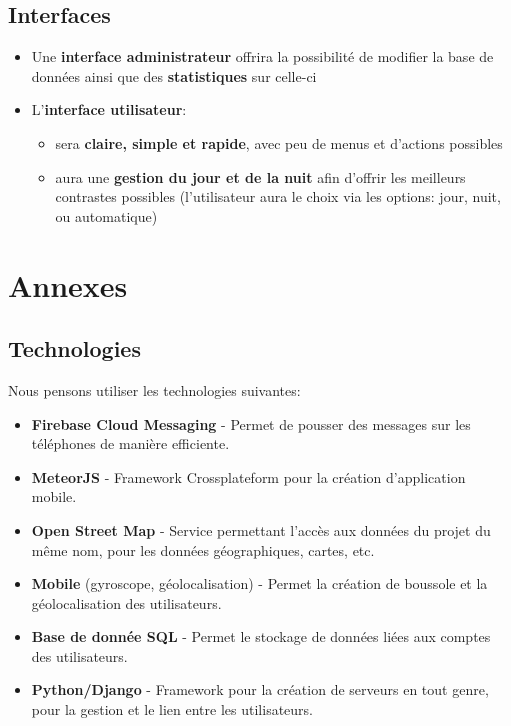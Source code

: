 \documentclass[french]{article}
\begin{document}
		\subsection{Interfaces}
			\begin{itemize}
				\item Une \textbf{interface administrateur} offrira la possibilité de modifier la base de données ainsi que des \textbf{statistiques} sur celle-ci
				\item L'\textbf{interface utilisateur}:
				\begin{itemize}
					\item sera \textbf{claire, simple et rapide}, avec peu de menus et d'actions possibles
					\item aura une \textbf{gestion du jour et de la nuit} afin d'offrir les meilleurs contrastes possibles (l'utilisateur aura le choix via les options: jour, nuit, ou automatique)
				\end{itemize}
			\end{itemize}
		
	\section{Annexes}
		\subsection{Technologies}
		\label{subsec:technologies}
			Nous pensons utiliser les technologies suivantes:
			\begin{itemize}
				\item \textbf{Firebase Cloud Messaging} - Permet de pousser des messages sur les téléphones de manière efficiente.
				\item \textbf{MeteorJS} - Framework Crossplateform pour la création d'application mobile.
				\item \textbf{Open Street Map} - Service permettant l'accès aux données du projet du même nom, pour les données géographiques, cartes, etc.
				\item \textbf{Mobile} (gyroscope, géolocalisation) - Permet la création de boussole et la géolocalisation des utilisateurs.
				\item \textbf{Base de donnée SQL} - Permet le stockage de données liées aux comptes des utilisateurs.
				\item \textbf{Python/Django} - Framework pour la création de serveurs en tout genre, pour la gestion et le lien entre les utilisateurs. \\
			\end{itemize}
		
\end{document}
